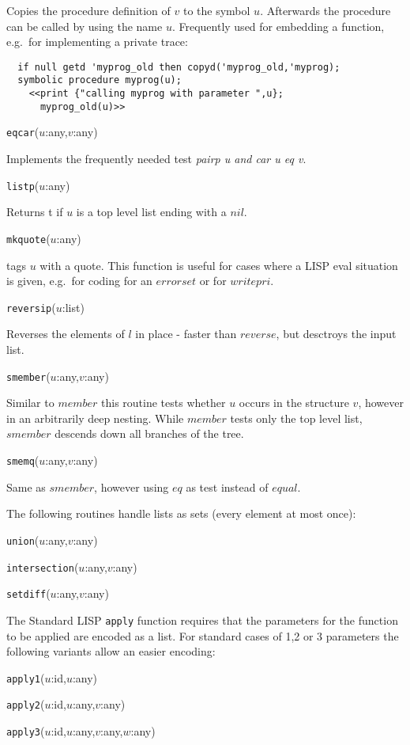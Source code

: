 \noindent
Copies the procedure definition of $v$ to the symbol $u$. Afterwards
the procedure can be called by using the name $u$.  Frequently
used for embedding a function, e.g.\  for implementing a private
trace:
\begin{verbatim}
  if null getd 'myprog_old then copyd('myprog_old,'myprog);
  symbolic procedure myprog(u);
    <<print {"calling myprog with parameter ",u};
      myprog_old(u)>>
\end{verbatim}

\vspace{5mm}    
{\tt eqcar}($u$:any,$v$:any)

\noindent
Implements the frequently needed test {\em pairp u and car u eq v}.

\vspace{5mm}    
{\tt listp}($u$:any)

\noindent
Returns t if $u$ is a top level list ending with a $nil$.

\vspace{5mm}    
{\tt mkquote}($u$:any)

\noindent
tags $u$ with a quote. This function is useful for cases where
a LISP eval situation is given, e.g.\   for coding for an $errorset$
or for $writepri$.

\vspace{5mm}    
{\tt reversip}($u$:list)

\noindent
Reverses the elements of $l$ in place - faster than $reverse$, but
desctroys the input list.

\vspace{5mm}    
{\tt smember}($u$:any,$v$:any)

\noindent
Similar to $member$ this routine tests whether $u$ occurs in
the structure $v$, however in an arbitrarily deep nesting.
While $member$ tests only the top level
list, $smember$ descends down all branches of the tree.

\vspace{5mm}    
{\tt smemq}($u$:any,$v$:any)

\noindent
Same as $smember$, however using $eq$ as test instead of $equal$.

\vspace{5mm}    
\noindent
The following routines handle lists as sets (every element
at most once):

{\tt union}($u$:any,$v$:any)

{\tt intersection}($u$:any,$v$:any)

{\tt setdiff}($u$:any,$v$:any)  %

\vspace{5mm}
\noindent
The Standard LISP {\tt apply} function requires that the parameters
for the function to be applied are encoded as a list. For standard
cases of 1,2 or 3 parameters the following variants allow an easier 
encoding:

{\tt apply1}($u$:id,$u$:any)

{\tt apply2}($u$:id,$u$:any,$v$:any)

{\tt apply3}($u$:id,$u$:any,$v$:any,$w$:any)
\printindex


